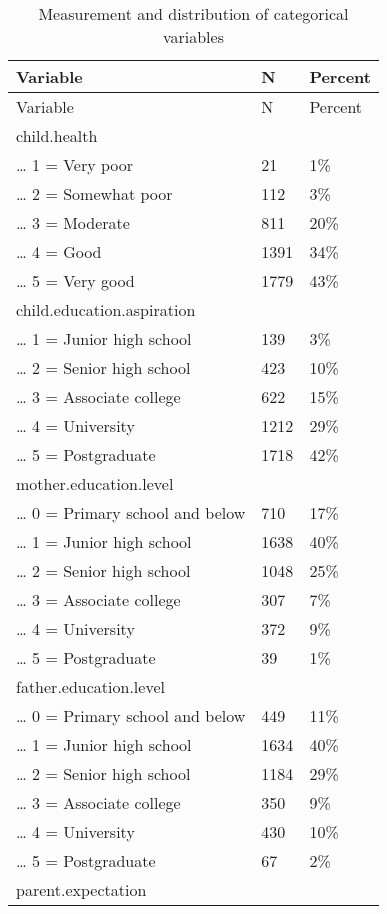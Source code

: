 \documentclass[
  man,floatsintext]{apa7}
\begin{document}
\newpage

\begin{longtable}[]{@{}lll@{}}
\caption{\label{tab:tab-ctvar-msr}Measurement and distribution of categorical variables}\tabularnewline
\toprule()
Variable & N & Percent \\
\midrule()
\endfirsthead
\toprule()
Variable & N & Percent \\
\midrule()
\endhead
child.health & & \\
\ldots{} 1 = Very poor & 21 & 1\% \\
\ldots{} 2 = Somewhat poor & 112 & 3\% \\
\ldots{} 3 = Moderate & 811 & 20\% \\
\ldots{} 4 = Good & 1391 & 34\% \\
\ldots{} 5 = Very good & 1779 & 43\% \\
child.education.aspiration & & \\
\ldots{} 1 = Junior high school & 139 & 3\% \\
\ldots{} 2 = Senior high school & 423 & 10\% \\
\ldots{} 3 = Associate college & 622 & 15\% \\
\ldots{} 4 = University & 1212 & 29\% \\
\ldots{} 5 = Postgraduate & 1718 & 42\% \\
mother.education.level & & \\
\ldots{} 0 = Primary school and below & 710 & 17\% \\
\ldots{} 1 = Junior high school & 1638 & 40\% \\
\ldots{} 2 = Senior high school & 1048 & 25\% \\
\ldots{} 3 = Associate college & 307 & 7\% \\
\ldots{} 4 = University & 372 & 9\% \\
\ldots{} 5 = Postgraduate & 39 & 1\% \\
father.education.level & & \\
\ldots{} 0 = Primary school and below & 449 & 11\% \\
\ldots{} 1 = Junior high school & 1634 & 40\% \\
\ldots{} 2 = Senior high school & 1184 & 29\% \\
\ldots{} 3 = Associate college & 350 & 9\% \\
\ldots{} 4 = University & 430 & 10\% \\
\ldots{} 5 = Postgraduate & 67 & 2\% \\
parent.expectation & & \\

\end{longtable}
\end{document}
